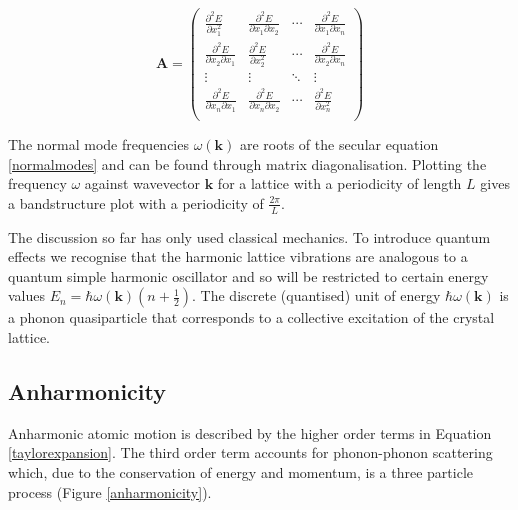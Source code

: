 \begin{equation} \label{forceconstant}
\textbf{A} = 
\begin{pmatrix} 
\frac{\partial^2E}{\partial x_1^2} &\frac{\partial^2E}{\partial x_1 \partial x_2} & \cdots & \frac{\partial^2E}{\partial x_1 \partial x_n}\\
\frac{\partial^2E}{\partial x_2 \partial x_1}&\frac{\partial^2E}{\partial x_2^2} & \cdots & \frac{\partial^2E}{\partial x_2 \partial x_n}\\
\vdots & \vdots & \ddots & \vdots \\
\frac{\partial^2E}{\partial x_n \partial x_1}&\frac{\partial^2E}{\partial x_n \partial x_2} & \cdots & \frac{\partial^2E}{\partial x_n^2}\\
\end{pmatrix}
\end{equation}

The normal mode frequencies $\omega(\textbf{k})$ are roots of the secular equation \ref{normalmodes} and can be found through matrix diagonalisation. Plotting the frequency $\omega$ against wavevector $\textbf{k}$ for a lattice with a periodicity of length $L$ gives a bandstructure plot with a periodicity of $\frac{2\pi}{L}$.   %

The discussion so far has only used classical mechanics. To introduce quantum effects we recognise that the harmonic lattice vibrations are analogous to a quantum simple harmonic oscillator and so will be restricted to certain energy values $E_n = \hbar\omega(\textbf{k})(n+\frac{1}{2})$.
The discrete (quantised) unit of energy $\hbar\omega(\textbf{k})$ is a phonon quasiparticle that corresponds to a collective excitation of the crystal lattice.

\subsection{Anharmonicity} \label{anharmonicapprox}

Anharmonic atomic motion is described by the higher order terms in Equation \ref{taylorexpansion}.
The third order term accounts for phonon-phonon scattering which, due to the conservation of energy and momentum, is a three particle process (Figure \ref{anharmonicity}).\autocite{Lundstrom2000}

